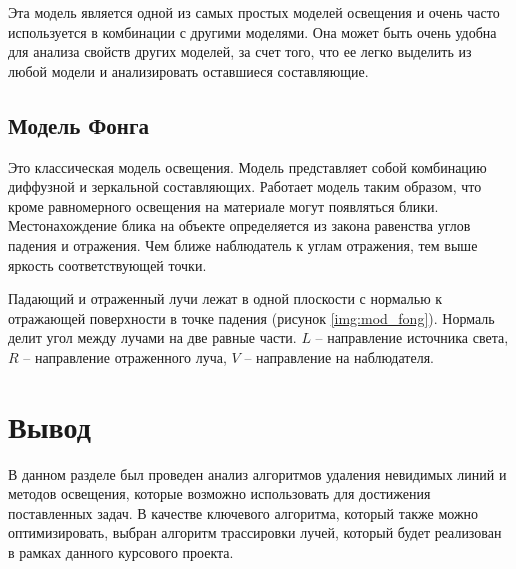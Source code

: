 Эта модель является одной из самых простых моделей освещения и очень часто используется в комбинации с другими моделями. Она может быть очень удобна для анализа свойств других моделей, за счет того, что ее легко выделить из любой модели и анализировать оставшиеся составляющие.

\subsection*{Модель Фонга}

Это классическая модель освещения. Модель представляет собой комбинацию диффузной и зеркальной составляющих. Работает модель таким образом, что кроме равномерного освещения на материале могут появляться блики. Местонахождение блика на объекте определяется из закона равенства углов падения и отражения. Чем ближе наблюдатель к углам отражения, тем выше яркость соответствующей точки.


Падающий и отраженный лучи лежат в одной плоскости с нормалью к отражающей поверхности в точке падения (рисунок \ref{img:mod_fong}). Нормаль делит угол между лучами на две равные части. $L$ – направление источника света, $R$ – направление отраженного луча, $V$ – направление на наблюдателя.


\section{Вывод}

В данном разделе был проведен анализ алгоритмов удаления невидимых линий и методов освещения, которые возможно использовать для достижения поставленных задач. В качестве ключевого алгоритма, который также можно оптимизировать, выбран алгоритм трассировки лучей, который будет реализован в рамках данного курсового проекта.

